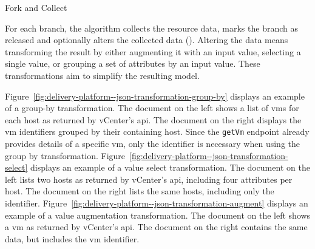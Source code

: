 \IncMargin{2em}
\begin{algorithm}[h]
	\footnotesize
	\DontPrintSemicolon
	\BlankLine

	\caption{Fork and Collect}
	\label{alg:delivery-platform--fork-and-collect}
\end{algorithm}

For each branch, the algorithm collects the resource data, marks the branch as released and optionally alters the collected data (). Altering the data means transforming the result by either augmenting it with an input value, selecting a single value, or grouping a set of attributes by an input value. These transformations aim to simplify the resulting model.

Figure~\ref{fig:delivery-platform--json-transformation-group-by} displays an example of a group-by transformation. The document on the left shows a list of \glspl{vm} for each host as returned by vCenter's \gls{api}. The document on the right displays the \gls{vm} identifiers grouped by their containing host. Since the \texttt{getVm} endpoint already provides details of a specific \gls{vm}, only the identifier is necessary when using the group by transformation. Figure~\ref{fig:delivery-platform--json-transformation-select} displays an example of a value select transformation. The document on the left lists two hosts as returned by vCenter's \gls{api}, including four attributes per host. The document on the right lists the same hosts, including only the identifier. Figure~\ref{fig:delivery-platform--json-transformation-augment} displays an example of a value augmentation transformation. The document on the left shows a \gls{vm} as returned by vCenter's \gls{api}. The document on the right contains the same data, but includes the \gls{vm} identifier.

